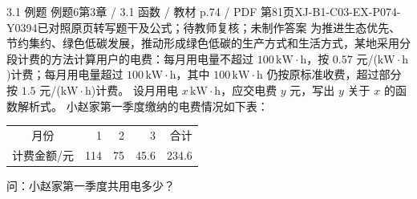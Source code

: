 \par\noindent\begin{minipage}{\linewidth}
\begin{bankitem}{3.1 例题 例题6}{第3章 / 3.1 函数 / 教材 p.74 / PDF 第81页}{XJ-B1-C03-EX-P074-Y0394}{已对照原页转写题干及公式；待教师复核；未制作答案}
为推进生态优先、节约集约、绿色低碳发展，推动形成绿色低碳的生产方式和生活方式，某地采用分段计费的方法计算用户的电费：每月用电量不超过 $100\,\mathrm{kW\cdot h}$，按 $0.57$ 元/($\mathrm{kW\cdot h}$)计费；每月用电量超过 $100\,\mathrm{kW\cdot h}$，其中 $100\,\mathrm{kW\cdot h}$ 仍按原标准收费，超过部分按 $1.5$ 元/($\mathrm{kW\cdot h}$)计费。
设月用电 $x\,\mathrm{kW\cdot h}$，应交电费 $y$ 元，写出 $y$ 关于 $x$ 的函数解析式。
小赵家第一季度缴纳的电费情况如下表：
\begin{center}\begin{tabular}{c|rrrr}\hline
月份&1&2&3&合计\\
计费金额/元&114&75&45.6&234.6\\\hline
\end{tabular}\end{center}
问：小赵家第一季度共用电多少？
\end{bankitem}
\end{minipage}\par\medskip
